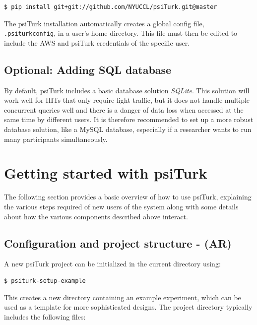 \documentclass[twocolumn]{svjour3}          %
\begin{document}
\begin{lstlisting}
$ pip install git+git://github.com/NYUCCL/psiTurk.git@master
\end{lstlisting}

The psiTurk installation automatically creates a global config file, \texttt{.psiturkconfig}, in a user's home directory. 
This file must then be edited to include the AWS and psiTurk credentials of the specific user. 

\subsection{Optional: Adding SQL database}
By default, psiTurk includes a basic database solution \emph{SQLite}. This solution
will work well for HITs that only require light traffic, but it does not handle
multiple concurrent queries well and there is a danger of data loss when accessed at the same time by different users. 
It is therefore recommended to set up a more robust database solution, like a
MySQL database, especially if a researcher wants to run many participants simultaneously.  



\section{Getting started with \textsf{psiTurk}}

The following section provides a basic overview of how to use psiTurk,
explaining the various steps required of new users of the system along with
some details about how the various components described above interact.

\subsection{Configuration and project structure - (AR)}

A new \textsf{psiTurk} project can be initialized in the current directory using:

\begin{lstlisting}
$ psiturk-setup-example
\end{lstlisting}

\noindent This creates a new directory containing an example experiment,
which can be used as a template for more sophisticated designs.
The project directory typically includes the following files: 
\end{document}
